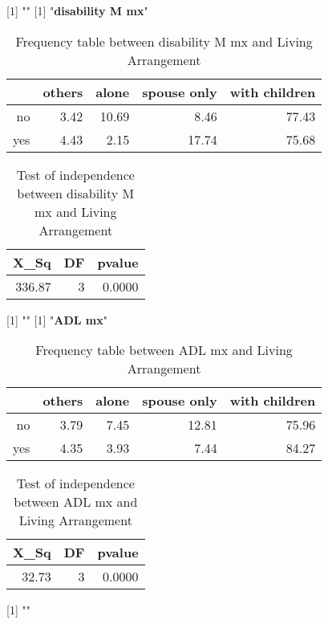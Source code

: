 \documentclass[11pt]{article}
\begin{document}
[1] "\newline"
[1] "{\bf{disability M mx}}"
\begin{table}[H]
\centering
\begin{tabular}{rrrrr}
  \hline
 & others & alone & spouse only & with children \\ 
  \hline
no & 3.42 & 10.69 & 8.46 & 77.43 \\ 
  yes & 4.43 & 2.15 & 17.74 & 75.68 \\ 
   \hline
\end{tabular}
\caption{Frequency table between disability M mx and Living Arrangement} 
\end{table}
\begin{table}[H]
\centering
\begin{tabular}{rrr}
  \hline
X\_Sq & DF & pvalue \\ 
  \hline
336.87 & 3 & 0.0000 \\ 
   \hline
\end{tabular}
\caption{Test of independence between disability M mx and Living Arrangement} 
\end{table}
[1] "\newline"
[1] "{\bf{ADL mx}}"
\begin{table}[H]
\centering
\begin{tabular}{rrrrr}
  \hline
 & others & alone & spouse only & with children \\ 
  \hline
no & 3.79 & 7.45 & 12.81 & 75.96 \\ 
  yes & 4.35 & 3.93 & 7.44 & 84.27 \\ 
   \hline
\end{tabular}
\caption{Frequency table between ADL mx and Living Arrangement} 
\end{table}
\begin{table}[H]
\centering
\begin{tabular}{rrr}
  \hline
X\_Sq & DF & pvalue \\ 
  \hline
32.73 & 3 & 0.0000 \\ 
   \hline
\end{tabular}
\caption{Test of independence between ADL mx and Living Arrangement} 
\end{table}
[1] "\newline"
\end{document}
